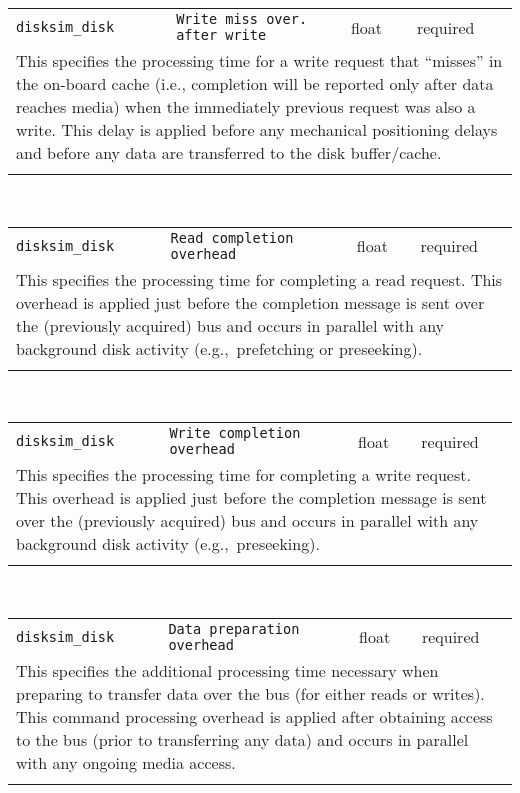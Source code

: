 \noindent 
\begin{tabular}{|p{\lpmodwidth}|p{\lpnamewidth}|p{0.5in}|p{0.5in}|}
\cline{1-4}
\texttt{disksim\_disk} & \texttt{Write miss over. after write} & float & required \\ 
\cline{1-4}
\multicolumn{4}{|p{6in}|}{
This specifies the processing time for a write request that ``misses'' in
the on-board cache (i.e., completion will be reported only after data
reaches media) when the immediately previous request was also a write.
This delay is applied before any mechanical positioning delays and
before any data are transferred to the disk buffer/cache.
}\\ 
\cline{1-4}
\multicolumn{4}{p{5in}}{}\\
\end{tabular}\\ 
\noindent 
\begin{tabular}{|p{\lpmodwidth}|p{\lpnamewidth}|p{0.5in}|p{0.5in}|}
\cline{1-4}
\texttt{disksim\_disk} & \texttt{Read completion overhead} & float & required \\ 
\cline{1-4}
\multicolumn{4}{|p{6in}|}{
This specifies the processing time for completing a read request.
This overhead is applied just before the completion message is sent
over the (previously acquired) bus and occurs in parallel with any
background disk activity (e.g.,~prefetching or preseeking).
}\\ 
\cline{1-4}
\multicolumn{4}{p{5in}}{}\\
\end{tabular}\\ 
\noindent 
\begin{tabular}{|p{\lpmodwidth}|p{\lpnamewidth}|p{0.5in}|p{0.5in}|}
\cline{1-4}
\texttt{disksim\_disk} & \texttt{Write completion overhead} & float & required \\ 
\cline{1-4}
\multicolumn{4}{|p{6in}|}{
This specifies the processing time for completing a write request.
This overhead is applied just before the completion message is sent
over the (previously acquired) bus and occurs in parallel with any
background disk activity (e.g.,~preseeking).
}\\ 
\cline{1-4}
\multicolumn{4}{p{5in}}{}\\
\end{tabular}\\ 
\noindent 
\begin{tabular}{|p{\lpmodwidth}|p{\lpnamewidth}|p{0.5in}|p{0.5in}|}
\cline{1-4}
\texttt{disksim\_disk} & \texttt{Data preparation overhead} & float & required \\ 
\cline{1-4}
\multicolumn{4}{|p{6in}|}{
This specifies the additional processing time necessary when preparing to
transfer data over the bus (for either reads or writes). This command
processing overhead is applied after obtaining access to the bus
(prior to transferring any data) and occurs in parallel with any
ongoing media access.
}\\ 
\cline{1-4}
\multicolumn{4}{p{5in}}{}\\
\end{tabular}\\ 
